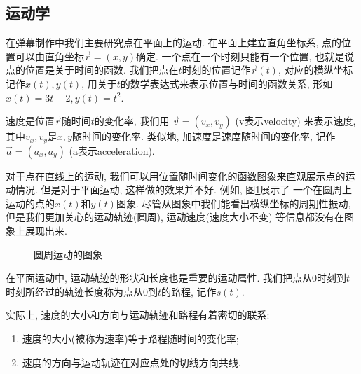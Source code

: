 \subsection{运动学}

在弹幕制作中我们主要研究点在平面上的运动.
在平面上建立直角坐标系, 点的位置可以由直角坐标$\vec r=(x,y)$确定.
一个点在一个时刻只能有一个位置,
也就是说点的位置是关于时间的函数.
我们把点在$t$时刻的位置记作$\vec r(t)$,
对应的横纵坐标记作$x(t),y(t)$,
用关于$t$的数学表达式来表示位置与时间的函数关系,
形如$x(t) = 3t-2, y(t) = t^2$.

速度是位置$\vec r$随时间$t$的变化率, 我们用
$\vec v=(v_x,v_y)$ (v表示velocity) 来表示速度,
其中$v_x,v_y$是$x,y$随时间的变化率.
类似地, 加速度是速度随时间的变化率,
记作$\vec a=(a_x,a_y)$ (a表示acceleration).

对于点在直线上的运动, 我们可以用位置随时间变化的函数图象来直观展示点的运动情况.
但是对于平面运动, 这样做的效果并不好.
例如, 图\ref{fig:circle-xy-figure}展示了
一个在圆周上运动的点的$x(t)$和$y(t)$图象.
尽管从图象中我们能看出横纵坐标的周期性振动,
但是我们更加关心的运动轨迹(圆周), 运动速度(速度大小不变)
等信息都没有在图象上展现出来.

\begin{figure}[htbp]
  \centering
  \caption{圆周运动的图象}
  \label{fig:circle-xy-figure}
\end{figure}

在平面运动中, 运动轨迹的形状和长度也是重要的运动属性.
我们把点从$0$时刻到$t$时刻所经过的轨迹长度称为点从$0$到$t$的路程,
记作$s(t)$.

实际上, 速度的大小和方向与运动轨迹和路程有着密切的联系:
\begin{enumerate}[label=(\alph*)]
  \item 速度的大小(被称为速率)等于路程随时间的变化率;
  \item 速度的方向与运动轨迹在对应点处的切线方向共线.
\end{enumerate}

\begin{center}
\end{center}

